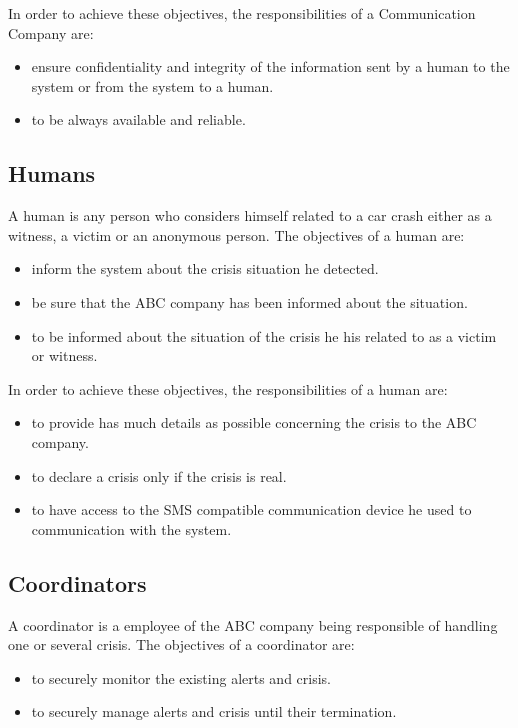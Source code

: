 In order to achieve these objectives, the responsibilities of a Communication Company are:
\begin{itemize}
  \item ensure confidentiality and integrity of the information sent by a human to the \msricrash system or from the system to a human.
  \item to be always available and reliable.
\end{itemize}

\subsection{Humans}
A human is any person who considers himself related to a car crash either as a witness, a victim or an anonymous person. The objectives of a human are:
\begin{itemize}
  \item inform the \msricrash system about the crisis situation he detected.
  \item be sure that the ABC company has been informed about the situation.
  \item to be informed about the situation of the crisis he his related to as a victim or witness.
\end{itemize}
\vspace{0.5cm}

In order to achieve these objectives, the responsibilities of a human are:
\begin{itemize}
  \item to provide has much details as possible concerning the crisis to the ABC company.
  \item to declare a crisis only if the crisis is real.
  \item to have access to the SMS compatible communication device he used to communication with the \msricrash system.
\end{itemize}

\subsection{Coordinators}
A coordinator is a employee of the ABC company being responsible of handling one or several crisis. The objectives of a coordinator are:
\begin{itemize}
  \item to securely monitor the existing alerts and crisis.
  \item to securely manage alerts and crisis until their termination.
\end{itemize}
\vspace{0.5cm}

